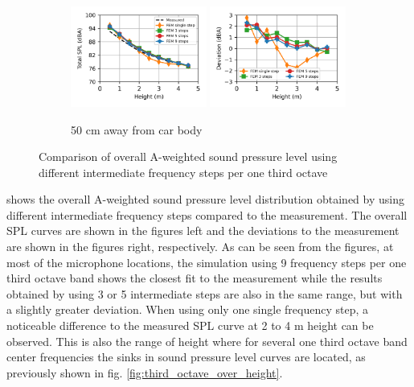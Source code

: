 \begin{figure}[H]\ContinuedFloat
	\begin{subfigure}[b]{\textwidth}
		\centering
		\includegraphics[width=0.49\textwidth]{fig/chap5/freq_steps/overall_SPL/pos_f.png}
		\includegraphics[width=0.49\textwidth]{fig/chap5/freq_steps/overall_SPL/pos_f_deviation.png}
		\caption{50 cm away from car body}
	\end{subfigure}
	\caption{Comparison of overall A-weighted sound pressure level using different intermediate frequency steps per one third octave}
	\label{fig:overall_SPL_freq_steps}
\end{figure}

\noindent{} shows the overall A-weighted sound pressure level distribution obtained by using different intermediate frequency steps compared to the measurement. The overall SPL curves are shown in the figures left and the deviations to the measurement are shown in the figures right, respectively. As can be seen from the figures, at most of the microphone locations, the simulation using 9 frequency steps per one third octave band shows the closest fit to the measurement while the results obtained by using 3 or 5 intermediate steps are also in the same range, but with a slightly greater deviation. When using only one single frequency step, a noticeable difference to the measured SPL curve at 2 to 4 m height can be observed. This is also the range of height where for several one third octave band center frequencies the sinks in sound pressure level curves are located, as previously shown in fig. \ref{fig:third_octave_over_height}.

